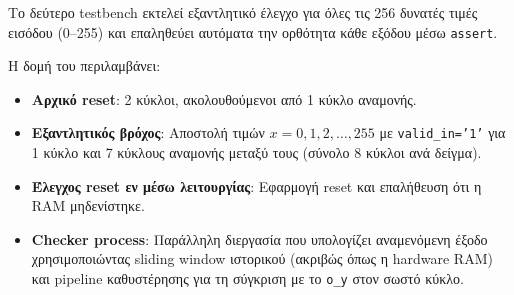 \documentclass[12pt]{article}
\begin{document}
Το δεύτερο testbench εκτελεί εξαντλητικό έλεγχο για όλες τις 256 δυνατές τιμές εισόδου (0--255) και επαληθεύει αυτόματα την ορθότητα κάθε εξόδου μέσω \texttt{assert}.

Η δομή του περιλαμβάνει:

\begin{itemize}
    \item \textbf{Αρχικό reset}: 2 κύκλοι, ακολουθούμενοι από 1 κύκλο αναμονής.
    \item \textbf{Εξαντλητικός βρόχος}: Αποστολή τιμών $x = 0, 1, 2, \ldots, 255$ με \texttt{valid\_in='1'} για 1 κύκλο και 7 κύκλους αναμονής μεταξύ τους (σύνολο 8 κύκλοι ανά δείγμα).
    \item \textbf{Έλεγχος reset εν μέσω λειτουργίας}: Εφαρμογή reset και επαλήθευση ότι η RAM μηδενίστηκε.
    \item \textbf{Checker process}: Παράλληλη διεργασία που υπολογίζει αναμενόμενη έξοδο χρησιμοποιώντας sliding window ιστορικού (ακριβώς όπως η hardware RAM) και pipeline καθυστέρησης για τη σύγκριση με το \texttt{o\_y} στον σωστό κύκλο.
\end{itemize}
\end{document}
